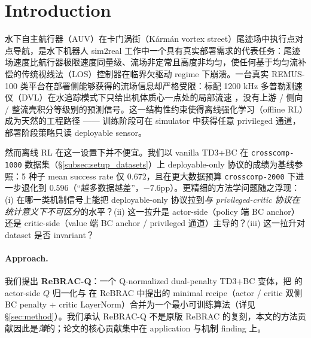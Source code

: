 %
%

\section{Introduction}\label{sec:intro}

水下自主航行器（AUV）在卡门涡街（Kármán vortex street）尾迹场中执行点对点导航，是水下机器人 sim2real 工作中一个具有真实部署需求的代表任务：尾迹场速度比航行器极限速度同量级、流场非定常且高度非均匀，使任何基于均匀流补偿的传统视线法（LOS）控制器在临界欠驱动 regime 下崩溃。一台真实 REMUS-100 类平台在部署侧能够获得的流场信息却严格受限：标配 1200 kHz 多普勒测速仪（DVL）在水追踪模式下只给出机体质心一点处的局部流速 \citep{fossen2011handbook}，没有上游 / 侧向 / 整流壳积分等级别的预测信号。这一结构性约束使得离线强化学习（offline RL）成为天然的工程路径 —— 训练阶段可在 simulator 中获得任意 privileged 通道，部署阶段策略只读 deployable sensor。

然而离线 RL 在这一设置下并不便宜。我们以 vanilla TD3+BC \citep{fujimoto2021td3bc} 在 \texttt{crosscomp-1000} 数据集（\S\ref{subsec:setup_datasets}）上 deployable-only 协议的成绩为基线参照：5 种子 mean success rate 仅 $0.672$，且在更大数据预算 \texttt{crosscomp-2000} 下进一步退化到 $0.596$（``越多数据越差''，$-7.6$pp）。更精细的方法学问题随之浮现：(i) 在哪一类机制信号上能把 deployable-only 协议拉到\emph{与 privileged-critic 协议在统计意义下不可区分}的水平？(ii) 这一拉升是 actor-side（policy 端 BC anchor）还是 critic-side（value 端 BC anchor / privileged 通道）主导的？(iii) 这一拉升对 dataset 是否 invariant？

\paragraph{Approach.}
我们提出 \textbf{ReBRAC-Q}：一个 Q-normalized dual-penalty TD3+BC 变体，把 \citet{fujimoto2021td3bc} 的 actor-side $Q$ 归一化与 \citet{tarasov2023rebrac} 在 ReBRAC 中提出的 minimal recipe（actor / critic 双侧 BC penalty + critic LayerNorm）合并为一个最小可训练算法（详见 \S\ref{sec:method}）。我们承认 ReBRAC-Q 不是原版 ReBRAC 的复刻，本文的方法贡献因此是\emph{薄}的；论文的核心贡献集中在 application 与机制 finding 上。

